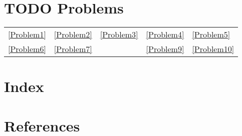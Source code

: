 \documentclass[11pt]{article}
\begin{document}
\section{{\bfseries\sffamily TODO} Problems}
\label{sec:org907c1ce}
\begin{center}
\begin{tabular}{lllll}
\ref{Problem1} & \ref{Problem2} & \ref{Problem3} & \ref{Problem4} & \ref{Problem5}\\
\ref{Problem6} & \ref{Problem7} &  & \ref{Problem9} & \ref{Problem10}\\
\end{tabular}
\end{center}

\section{Index}
\label{sec:org38bc5f2}

\renewcommand{\indexname}{}
\printindex

\section{References}
\label{sec:orge65c70e}

\label{bibliographystyle link}


\label{bibliography link}

\end{document}
